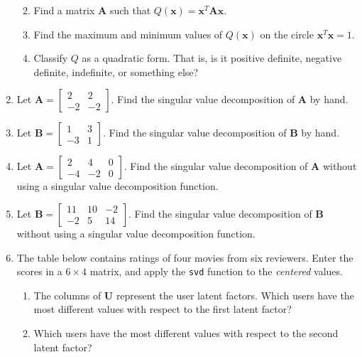 \documentclass[
]{book}
\providecommand{\tightlist}{%
  \setlength{\itemsep}{0pt}\setlength{\parskip}{0pt}}
\theoremstyle{definition}
\theoremstyle{definition}
\theoremstyle{definition}
\theoremstyle{definition}
\theoremstyle{remark}
\begin{document}
\begin{enumerate}
  \begin{enumerate}
  \def\labelenumii{\alph{enumii}.}
  \tightlist
  \item
    Find a matrix \(\mathbf{A}\) such that \(Q(\mathbf{x})=\mathbf{x}^T\mathbf{A}\mathbf{x}.\)
  \item
    Find the maximum and minimum values of \(Q(\mathbf{x})\) on the circle \(\mathbf{x}^T\mathbf{x}=1.\)
  \item
    Classify \(Q\) as a quadratic form. That is, is it positive definite, negative definite, indefinite, or something else?
  \end{enumerate}
\item
  Let \(\mathbf{A}=\begin{bmatrix}2 & 2\\-2 & -2\end{bmatrix}.\) Find the singular value decomposition of \(\mathbf{A}\) by hand.
\item
  Let \(\mathbf{B}=\begin{bmatrix}1 & 3\\-3 & 1\end{bmatrix}.\) Find the singular value decomposition of \(\mathbf{B}\) by hand.
\item
  Let \(\mathbf{A}=\begin{bmatrix}2 & 4 & 0\\-4 & -2 & 0\end{bmatrix}.\) Find the singular value decomposition of \(\mathbf{A}\) without using a singular value decomposition function.
\item
  Let \(\mathbf{B}=\begin{bmatrix}11 & 10 & -2\\-2 & 5 & 14\end{bmatrix}.\) Find the singular value decomposition of \(\mathbf{B}\) without using a singular value decomposition function.
\item
  The table below contains ratings of four movies from six reviewers\autocite{recommenderlab}. Enter the scores in a \(6\times 4\) matrix, and apply the \texttt{svd} function to the \emph{centered} values.

  \begin{enumerate}
  \def\labelenumii{\alph{enumii}.}
  \tightlist
  \item
    The columns of \(\mathbf{U}\) represent the user latent factors. Which users have the most different values with respect to the first latent factor?
  \item
    Which users have the most different values with respect to the second latent factor?
  \end{enumerate}
\end{enumerate}
\end{document}

